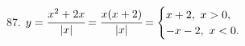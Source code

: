 87. $y=\cfrac{x^2+2x}{|x|}=\cfrac{x(x+2)}{|x|}=\begin{cases} x+2,\ x>0,\\ -x-2,\ x<0.\end{cases}$\\
\begin{figure}[ht!]
\end{figure}\newpage\noindent
